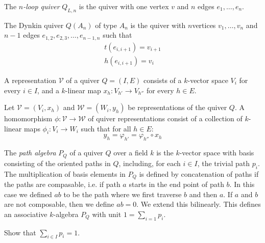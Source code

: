 \begin{defn}
The \emph{\(n\)-loop quiver} \(Q_{L,n}\) is the quiver with one vertex \(v\) and \(n\) edges \(e_{1},\ldots ,e_{n}\).
\end{defn}

\begin{defn}
The Dynkin quiver \(Q(A_{n})\) of type \(A_{n}\) is the quiver with \(n\)vertices \(v_{1},\ldots ,v_{n}\) and \(n-1\) edges \(e_{1,2},e_{2,3},\ldots ,e_{n-1,n}\) such that
\begin{gather*}t(e_{i,i+1})=v_{i+1} \\
h(e_{i,i+1}) =v_{i}\end{gather*}

\end{defn}

\begin{defn}
A representation \(\mathcal{V}\) of a quiver \(Q=(I,E)\) consists of a \(k\)-vector space \(V_{i}\) for every \(i\in I\), and a \(k\)-linear map \(x_{h}: V_{h'}\rightarrow V_{h''}\) for every \(h\in E\).
\end{defn}


\begin{defn}
Let \(\mathcal{V}=(V_{i},x_{h})\) and \(\mathcal{W}=(W_{i},y_{h})\) be representations of the quiver \(Q\). A homomorphism \(\phi : \mathcal{V}\rightarrow \mathcal{W}\) of quiver representations consist of a collection of \(k\)-linear maps \(\phi _{i}:V_{i}\rightarrow W_{i}\) such that for all \(h\in E\):
\[y_{h}=\varphi _{h'}=\varphi _{h''} \circ  x_{h}\]

\end{defn}

\begin{defn}

The \emph{path algebra} \(P_{Q}\) of a quiver \(Q\) over a field \(k\) is the \(k\)-vector space with basis consisting of the oriented paths in \(Q\), including, for each \(i\in I\), the trivial path \(p_{i}\). The multiplication of basis elements in \(P_{Q}\) is defined by concatenation of paths if the paths are compasable, i.e. if path $a$ starts in the end point of path \(b\). In this case we defined \(ab\) to be the path where we first traverse \(b\) and then \(a\). If \(a\) and \(b\) are not composable, then we define \(ab=0\). We extend this bilinearly. This defines an associative \(k\)-algebra \(P_{Q}\) with unit $1=\sum _{i=1}p_{i}$.

\end{defn}

\begin{prop}
Show that \(\sum _{i\in I}p_{i}=1\).
\end{prop}


